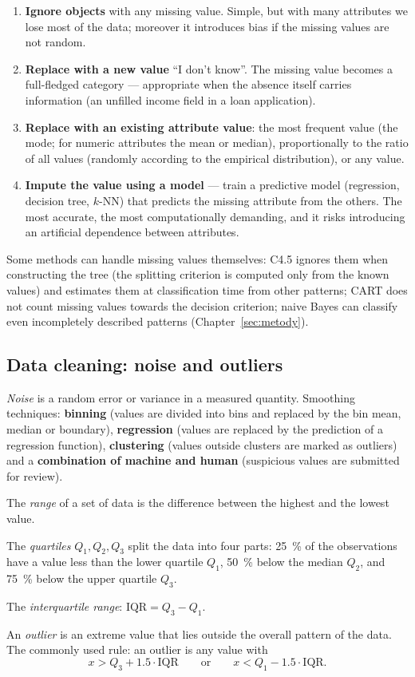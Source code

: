 \documentclass[11pt,a4paper]{article}
\theoremstyle{definition}
\providecommand{\uv}[1]{``#1''}
\begin{document}
\begin{enumerate}
\item \textbf{Ignore objects} with any missing value. Simple, but with many attributes we lose
      most of the data; moreover it introduces bias if the missing values are not random.
\item \textbf{Replace with a new value} \uv{I don't know}. The missing value becomes a
      full-fledged category --- appropriate when the absence itself carries information (an
      unfilled income field in a loan application).
\item \textbf{Replace with an existing attribute value}: the most frequent value (the mode; for
      numeric attributes the mean or median), proportionally to the ratio of all values
      (randomly according to the empirical distribution), or any value.
\item \textbf{Impute the value using a model} --- train a predictive model (regression, decision
      tree, $k$-NN) that predicts the missing attribute from the others. The most accurate, the
      most computationally demanding, and it risks introducing an artificial dependence between
      attributes.
\end{enumerate}

Some methods can handle missing values themselves: C4.5 ignores them when constructing the tree
(the splitting criterion is computed only from the known values) and estimates them at
classification time from other patterns; CART does not count missing values towards the decision
criterion; naive Bayes can classify even incompletely described patterns
(Chapter~\ref{sec:metody}).

\subsection{Data cleaning: noise and outliers}

\emph{Noise} is a random error or variance in a measured quantity. Smoothing techniques:
\textbf{binning} (values are divided into bins and replaced by the bin mean, median or boundary),
\textbf{regression} (values are replaced by the prediction of a regression function),
\textbf{clustering} (values outside clusters are marked as outliers) and a \textbf{combination
of machine and human} (suspicious values are submitted for review).

\begin{defbox}
The \emph{range} of a set of data is the difference between the highest and the lowest value.

The \emph{quartiles} $Q_1,Q_2,Q_3$ split the data into four parts: 25~\% of the observations
have a value less than the lower quartile $Q_1$, 50~\% below the median $Q_2$, and 75~\% below
the upper quartile $Q_3$.

The \emph{interquartile range}: $\mathrm{IQR}=Q_3-Q_1$.

An \emph{outlier} is an extreme value that lies outside the overall pattern of the data. The
commonly used rule: an outlier is any value with
\[ x > Q_3 + 1.5\cdot \mathrm{IQR} \qquad\text{or}\qquad x < Q_1 - 1.5\cdot \mathrm{IQR}. \]
\end{defbox}
\end{document}
